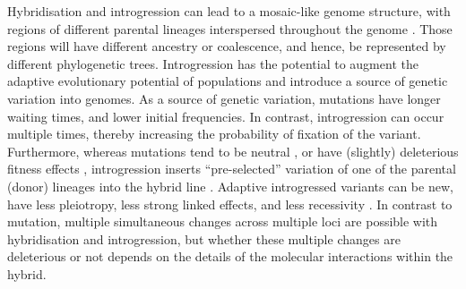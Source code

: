 Hybridisation and introgression can lead to a mosaic-like genome structure, with regions of different parental lineages interspersed throughout the genome \parencite{Baack2007,Stukenbrock2012}.
Those regions will have different ancestry or coalescence, and hence, be represented by different phylogenetic trees.
Introgression has the potential to augment the adaptive evolutionary potential of populations and introduce a source of genetic variation into genomes.
As a source of genetic variation, mutations have longer waiting times, and lower initial frequencies.
In contrast, introgression can occur multiple times, thereby increasing the probability of fixation of the variant.
Furthermore, whereas mutations tend to be neutral \parencite{Kimura1968EvolutionaryLevel.}, or have (slightly) deleterious fitness effects \parencite{Ohta1973}, introgression inserts “pre-selected” variation of one of the parental (donor) lineages into the hybrid line \parencite{Hedrick2013}.
Adaptive introgressed variants can be new, have less pleiotropy, less strong linked effects, and less recessivity \parencite{Hedrick2013}⁠.
In contrast to mutation, multiple simultaneous changes across multiple loci are possible with hybridisation and introgression, but whether these multiple changes are deleterious or not depends on the details of the molecular interactions within the hybrid.

